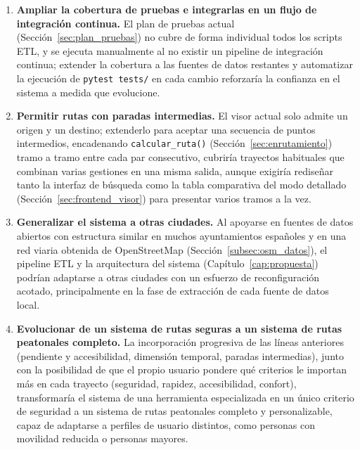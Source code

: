 \begin{enumerate}
    \item \textbf{Ampliar la cobertura de pruebas e integrarlas en un flujo de integración continua.} El plan de pruebas actual (Sección~\ref{sec:plan_pruebas}) no cubre de forma individual todos los scripts ETL, y se ejecuta manualmente al no existir un pipeline de integración continua; extender la cobertura a las fuentes de datos restantes y automatizar la ejecución de \texttt{pytest tests/} en cada cambio reforzaría la confianza en el sistema a medida que evolucione.

    \item \textbf{Permitir rutas con paradas intermedias.} El visor actual solo admite un origen y un destino; extenderlo para aceptar una secuencia de puntos intermedios, encadenando \texttt{calcular\_ruta()} (Sección~\ref{sec:enrutamiento}) tramo a tramo entre cada par consecutivo, cubriría trayectos habituales que combinan varias gestiones en una misma salida, aunque exigiría rediseñar tanto la interfaz de búsqueda como la tabla comparativa del modo detallado (Sección~\ref{sec:frontend_visor}) para presentar varios tramos a la vez.

    \item \textbf{Generalizar el sistema a otras ciudades.} Al apoyarse en fuentes de datos abiertos con estructura similar en muchos ayuntamientos españoles y en una red viaria obtenida de OpenStreetMap (Sección~\ref{subsec:osm_datos}), el pipeline ETL y la arquitectura del sistema (Capítulo~\ref{cap:propuesta}) podrían adaptarse a otras ciudades con un esfuerzo de reconfiguración acotado, principalmente en la fase de extracción de cada fuente de datos local.

    \item \textbf{Evolucionar de un sistema de rutas seguras a un sistema de rutas peatonales completo.} La incorporación progresiva de las líneas anteriores (pendiente y accesibilidad, dimensión temporal, paradas intermedias), junto con la posibilidad de que el propio usuario pondere qué criterios le importan más en cada trayecto (seguridad, rapidez, accesibilidad, confort), transformaría el sistema de una herramienta especializada en un único criterio de seguridad a un sistema de rutas peatonales completo y personalizable, capaz de adaptarse a perfiles de usuario distintos, como personas con movilidad reducida o personas mayores.
\end{enumerate}

